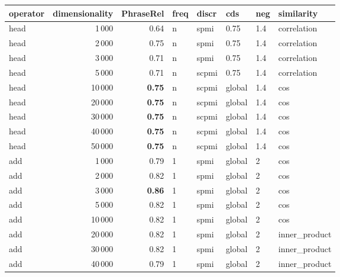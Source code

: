\begin{tabular}{lrrlllll}
\toprule
operator &  dimensionality &  PhraseRel &  freq &  discr &     cds &  neg &     similarity \\
\midrule
    head &            1\,000 &       0.64 &     n &   spmi &    0.75 &  1.4 &    correlation \\
    head &            2\,000 &       0.75 &     n &   spmi &    0.75 &  1.4 &    correlation \\
    head &            3\,000 &       0.71 &     n &   spmi &    0.75 &  1.4 &    correlation \\
    head &            5\,000 &       0.71 &     n &  scpmi &    0.75 &  1.4 &    correlation \\
    head &           10\,000 &       \textbf{0.75} &     n &  scpmi &  global &  1.4 &            cos \\
    head &           20\,000 &       \textbf{0.75} &     n &  scpmi &  global &  1.4 &            cos \\
    head &           30\,000 &       \textbf{0.75} &     n &  scpmi &  global &  1.4 &            cos \\
    head &           40\,000 &       \textbf{0.75} &     n &  scpmi &  global &  1.4 &            cos \\
    head &           50\,000 &       \textbf{0.75} &     n &  scpmi &  global &  1.4 &            cos \\ \addlinespace
     add &            1\,000 &       0.79 &     1 &   spmi &  global &    2 &            cos \\
     add &            2\,000 &       0.82 &     1 &   spmi &  global &    2 &            cos \\
     add &            3\,000 &       \textbf{0.86} &     1 &   spmi &  global &    2 &            cos \\
     add &            5\,000 &       0.82 &     1 &   spmi &  global &    2 &            cos \\
     add &           10\,000 &       0.82 &     1 &   spmi &  global &    2 &            cos \\
     add &           20\,000 &       0.82 &     1 &   spmi &  global &    2 &  inner\_product \\
     add &           30\,000 &       0.82 &     1 &   spmi &  global &    2 &  inner\_product \\
     add &           40\,000 &       0.79 &     1 &   spmi &  global &    2 &  inner\_product \\

\end{tabular}
